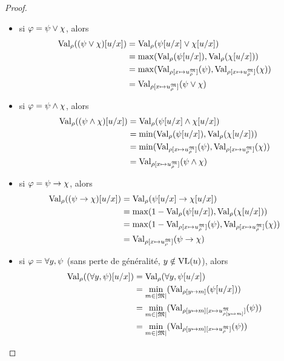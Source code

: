 \begin{proof}
\begin{itemize}
\begin{align*}
    \end{align*}
  \item si $\varphi = \psi \lor \chi$, alors
    \begin{align*}
      \operatorname{Val}_{\rho}((\psi \lor \chi)[u/x]) &= \operatorname{Val}_{\rho}(\psi[u/x] \lor \chi[u/x])\\
      &= \max (\operatorname{Val}_{\rho}(\psi[u/x]),\operatorname{Val}_{\rho}(\chi[u/x]))\\
      &= \max (\operatorname{Val}_{\rho[x\mapsto u^{\mathfrak{M}}_{\rho}]}(\psi),
      \operatorname{Val}_{\rho[x \mapsto u^{\mathfrak{M}}_{\rho}]}(\chi))\\
      &= \operatorname{Val}_{\rho[x\mapsto u^{\mathfrak{M}}_{\rho}]}(\psi\lor \chi)
    \end{align*}
  \item si $\varphi = \psi \land \chi$, alors
    \begin{align*}
      \operatorname{Val}_{\rho}((\psi \land \chi)[u/x])
      &= \operatorname{Val}_{\rho}(\psi[u/x] \land \chi[u/x])\\
      &= \min (\operatorname{Val}_{\rho}(\psi[u/x]),\operatorname{Val}_{\rho}(\chi[u/x]))\\
      &= \min (\operatorname{Val}_{\rho[x\mapsto u^{\mathfrak{M}}_{\rho}]}(\psi),
      \operatorname{Val}_{\rho[x \mapsto u^{\mathfrak{M}}_{\rho}]}(\chi))\\
      &= \operatorname{Val}_{\rho[x\mapsto u^{\mathfrak{M}}_{\rho}]}(\psi\land \chi)
    \end{align*}
  \item si $\varphi = \psi \to \chi$, alors
    \begin{align*}
      \operatorname{Val}_{\rho}((\psi \to \chi)[u/x]) &= \operatorname{Val}_{\rho}(\psi[u/x] \to \chi[u/x])\\
      &= \max (1 - \operatorname{Val}_{\rho}(\psi[u/x]),\operatorname{Val}_{\rho}(\chi[u/x]))\\
      &= \max (1 - \operatorname{Val}_{\rho[x\mapsto u^{\mathfrak{M}}_{\rho}]}(\psi),
      \operatorname{Val}_{\rho[x \mapsto u^{\mathfrak{M}}_{\rho}]}(\chi))\\
      &= \operatorname{Val}_{\rho[x\mapsto u^{\mathfrak{M}}_{\rho}]}(\psi\to \chi)
    \end{align*}
  \item si $\varphi = \forall y, \psi$ (sans perte de généralité,
    $y\notin \operatorname{VL}(u)$), alors
    \begin{align*}
      \ValE((\forall y,\varFP)[u/x]) &= \ValE(\forall y,\varFP[u/x])\\
      &= \min_{m\in\carMM}(\ValP{\env[y \mapsto m]}(\varFP[u/x]))\\
      &= \min_{m\in\carMM}(\ValP{\env[y\mapsto m]
        [x\mapsto \toMIP{u}{\varMM}{\env[y\mapsto m]}]}(\varFP))\\
      &= \min_{m\in\carMM}(\ValP{\env[y\mapsto m][x\mapsto \toMMI{u}]}(\varFP))\\

\end{align*}
\end{itemize}
\end{proof}
